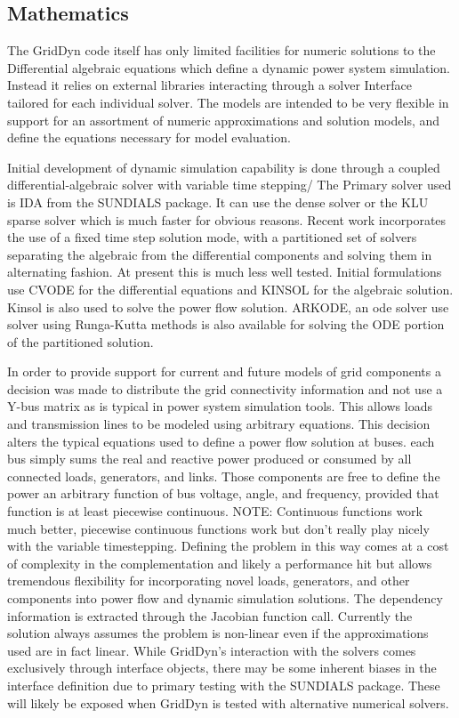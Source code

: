 \documentclass[12pt]{article} %
\begin{document}
\subsection{Mathematics}
The GridDyn code itself has only limited facilities for numeric solutions to the Differential algebraic equations which define a dynamic power system simulation.  Instead it relies on external libraries interacting through a solver Interface tailored for each individual solver.  The models are intended to be very flexible in support for an assortment of numeric approximations and solution models, and define the equations necessary for model evaluation.

Initial development of dynamic simulation capability is done through a coupled differential-algebraic solver with variable time stepping/  The Primary solver used is IDA from the SUNDIALS package\cite{sundials}.  It can use the dense solver or the KLU sparse solver which is much faster for obvious reasons.  Recent work incorporates the use of a fixed time step solution mode, with a partitioned set of solvers separating the algebraic from the differential components and solving them in alternating fashion.  At present this is much less well tested.  Initial formulations use CVODE for the differential equations and KINSOL for the algebraic solution.  Kinsol is also used to solve the power flow solution.  ARKODE, an ode solver use solver using Runga-Kutta methods is also available for solving the ODE portion of the partitioned solution.  

In order to provide support for current and future models of grid components a decision was made to distribute the grid connectivity information and not use a Y-bus matrix as is typical in power system simulation tools.  This allows loads and transmission lines to be modeled using arbitrary equations.  This decision alters the typical equations used to define a power flow solution at buses.  each bus simply sums the real and reactive power produced or consumed by all connected loads, generators, and links.  Those components are free to define the power an arbitrary function of bus voltage, angle, and frequency,  provided that function is at least piecewise continuous.  NOTE:  Continuous functions work much better, piecewise continuous functions work but don't really play nicely with the variable timestepping.  Defining the problem in this way comes at a cost of complexity in the complementation and likely a performance hit but allows tremendous flexibility for incorporating novel loads, generators, and other components into power flow and dynamic simulation solutions.  The dependency information is extracted through the Jacobian function call. Currently the solution always assumes the problem is non-linear even if the approximations used are in fact linear.  While GridDyn's interaction with the solvers comes exclusively through interface objects, there may be some inherent biases in the interface definition due to primary testing with the SUNDIALS package.  These will likely be exposed when GridDyn is tested with alternative numerical solvers.     
\end{document}
